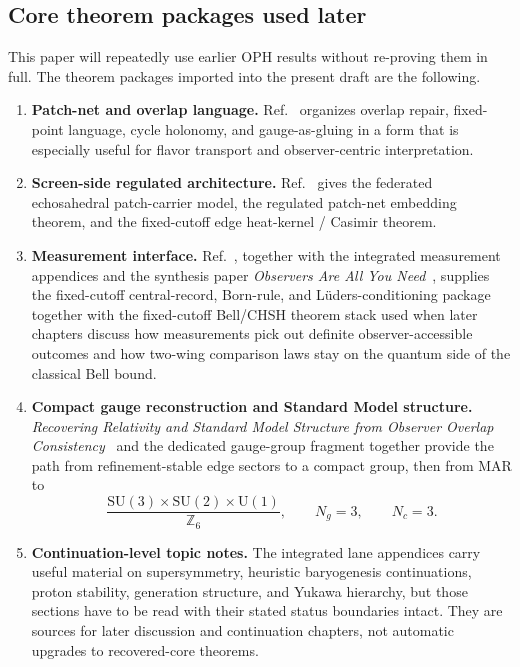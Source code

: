 \documentclass[11pt]{article}
\newcommand{\SU}{\mathrm{SU}}
\newcommand{\U}{\mathrm{U}}
\begin{document}
\subsection{Core theorem packages used later}

This paper will repeatedly use earlier OPH results without re-proving them in full. The
theorem packages imported into the present draft are the following.

\begin{enumerate}[leftmargin=2em]
\item \textbf{Patch-net and overlap language.} Ref.~\cite{ophconsensus} organizes overlap repair,
fixed-point language, cycle holonomy, and gauge-as-gluing in a form that is especially useful
for flavor transport and observer-centric interpretation.
\item \textbf{Screen-side regulated architecture.} Ref.~\cite{ophmicrophysics} gives the
federated echosahedral patch-carrier model, the regulated patch-net embedding theorem, and the
fixed-cutoff edge heat-kernel / Casimir theorem.
\item \textbf{Measurement interface.} Ref.~\cite{ophmicrophysics}, together with the integrated
measurement appendices and the synthesis paper \emph{Observers Are All You Need}~\cite{ophsynthesis}, supplies the fixed-cutoff central-record, Born-rule, and
L\"uders-conditioning package together with the fixed-cutoff Bell/CHSH theorem stack used when
later chapters discuss how measurements pick out definite observer-accessible outcomes and how
two-wing comparison laws stay on the quantum side of the classical Bell bound.
\item \textbf{Compact gauge reconstruction and Standard Model structure.}
\emph{Recovering Relativity and Standard Model Structure from Observer Overlap Consistency}~\cite{ophcompact}
and the dedicated gauge-group fragment together provide the path from refinement-stable
edge sectors to a compact group, then from MAR to
\[
\frac{\SU(3)\times\SU(2)\times\U(1)}{\mathbb Z_6},
\qquad
N_g=3,
\qquad
N_c=3.
\]
\item \textbf{Continuation-level topic notes.} The integrated lane appendices carry useful material
on supersymmetry, heuristic baryogenesis continuations, proton stability, generation structure, and Yukawa hierarchy,
but those sections have to be read with their stated status boundaries intact. They are sources
for later discussion and continuation chapters, not automatic upgrades to recovered-core theorems.
\end{enumerate}
\end{document}
